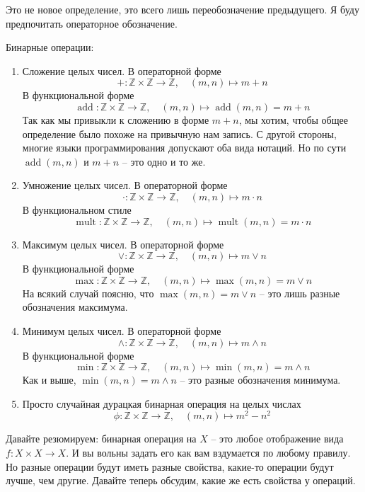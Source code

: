 Это не новое определение, это всего лишь переобозначение предыдущего.
Я буду предпочитать операторное обозначение.

\begin{examples}
Бинарные операции:
\begin{enumerate}
\item Сложение целых чисел.
В операторной форме
\[
+\colon \mathbb Z\times \mathbb Z\to \mathbb Z,\quad (m,n) \mapsto m + n
\]
В функциональной форме
\[
\operatorname{add}\colon \mathbb Z\times \mathbb Z\to \mathbb Z,\quad (m,n) \mapsto \operatorname{add}(m,n) = m+n
\]
Так как мы привыкли к сложению в форме $m + n$, мы хотим, чтобы общее определение было похоже на привычную нам запись.
С другой стороны, многие языки программирования допускают оба вида нотаций.
Но по сути $\operatorname{add}(m,n)$ и $m+n$ -- это одно и то же.

\item Умножение целых чисел.
В операторной форме
\[
\cdot\colon \mathbb Z\times \mathbb Z\to \mathbb Z,\quad (m,n) \mapsto m \cdot n
\]
В функциональном стиле
\[
\operatorname{mult}\colon \mathbb Z\times \mathbb Z\to \mathbb Z,\quad (m,n) \mapsto \operatorname{mult}(m,n) = m\cdot n
\]

\item Максимум целых чисел.
В операторной форме
\[
\vee\colon \mathbb Z\times \mathbb Z\to \mathbb Z,\quad (m,n) \mapsto m \vee n
\]
В функциональной форме
\[
\operatorname{max}\colon \mathbb Z\times \mathbb Z\to \mathbb Z,\quad (m,n) \mapsto \operatorname{max}(m,n) = m\vee n
\]
На всякий случай поясню, что $\max(m,n) = m \vee n$ -- это лишь разные обозначения максимума.

\item Минимум целых чисел.
В операторной форме
\[
\wedge\colon \mathbb Z\times \mathbb Z\to \mathbb Z,\quad (m,n) \mapsto m \wedge n
\]
В функциональной форме
\[
\operatorname{min}\colon \mathbb Z\times \mathbb Z\to \mathbb Z,\quad (m,n) \mapsto \operatorname{min}(m,n) = m\wedge n
\]
Как и выше, $\min(m,n) = m \wedge n$ -- это разные обозначения минимума.

\item Просто случайная дурацкая бинарная операция на целых числах
\[
\phi\colon \mathbb Z\times \mathbb Z\to \mathbb Z,\quad (m,n)\mapsto m^2 - n^2
\]
\end{enumerate}
\end{examples}

Давайте резюмируем: бинарная операция на $X$ -- это любое отображение вида $f\colon X\times X\to X$.
И вы вольны задать его как вам вздумается по любому правилу.
Но разные операции будут иметь разные свойства, какие-то операции будут лучше, чем другие.
Давайте теперь обсудим, какие же есть свойства у операций.

